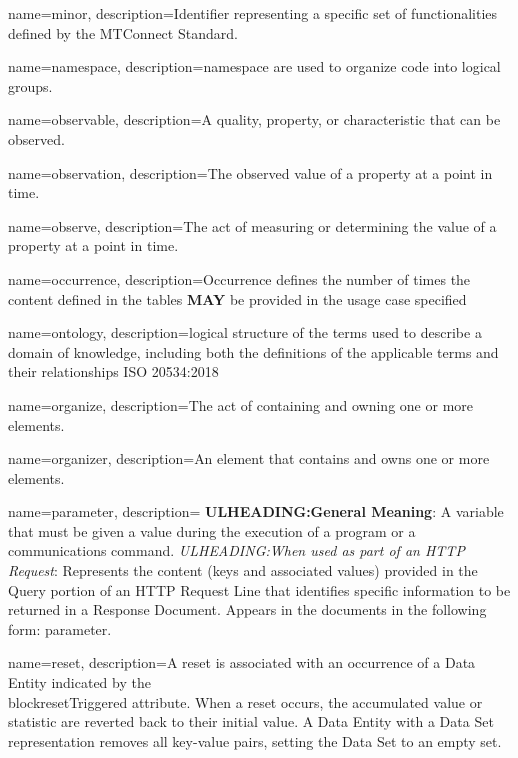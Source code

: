 {
    name={minor},
	description={Identifier representing a specific set of functionalities defined by the MTConnect Standard.}
}

{
    name={namespace},
	description={\gls{namespace} are used to organize code into logical groups.}
}

{
    name={observable},
	description={A quality, property, or characteristic that can be observed.}
}

{
    name={observation},
	description={The observed value of a property at a point in time.}
}

{
    name={observe},
	description={The act of measuring or determining the value of a property at a point in time.}
}

{
    name={occurrence},
	description={Occurrence defines the number of times the content defined in the tables \textbf{MAY} be provided in the usage case specified}
}

{
    name={ontology},
	description={logical structure of the terms used to describe a domain of knowledge, including both the definitions of the applicable terms and their relationships ISO 20534:2018}
}

{
    name={organize},
	description={The act of containing and owning one or more elements.}
}

{
    name={organizer},
	description={An element that contains and owns one or more elements.}
}

{
    name={parameter},
	description={
	\textbf{ULHEADING:General Meaning}:
	A variable that must be given a value during the execution of a program or a communications command.
	\textit{ULHEADING:When used as part of an \gls{HTTP Request}}:
	Represents the content (keys and associated values) provided in the \gls{Query} portion of an \gls{HTTP Request Line} that identifies specific information to be returned in a \gls{Response Document}.
	Appears in the documents in the following form: parameter.
}
}

{
    name={reset},
	description={A reset is associated with an occurrence of a \gls{Data Entity} indicated by the \\block{resetTriggered} attribute. When a reset occurs, the accumulated value or statistic are reverted back to their initial value. A \gls{Data Entity} with a \gls{Data Set} representation removes all \glspl{key-value pair}, setting the \gls{Data Set} to an empty set.}
}

